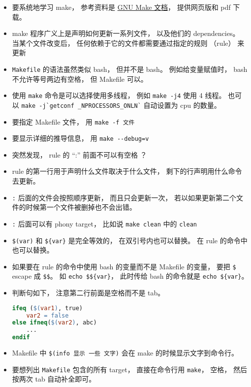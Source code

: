 


\begin{itemize}
\item 要系统地学习 make， 参考资料是 \href{https://www.gnu.org/software/make/manual/}{GNU Make 文档}， 提供网页版和 pdf 下载。
\item make 程序广义上是声明如何更新一系列文件， 以及他们的 dependencies。 当某个文件改变后， 任何依赖于它的文件都需要通过指定的规则 （rule） 来更新
\item \verb|Makefile| 的语法虽然类似 bash， 但并不是 bash。 例如给变量赋值时， bash 不允许等号两边有空格， 但 Makefile 可以。
\item 使用 \verb|make| 命令是可以选择使用多线程， 例如 \verb|make -j4| 使用 4 线程。 也可以 \verb|make -j`getconf _NPROCESSORS_ONLN`| 自动设置为 cpu 的数量。
\item 要指定 Makefile 文件， 用 \verb|make -f 文件|
\item 要显示详细的推导信息， 用 \verb|make --debug=v|
\item 突然发现， rule 的 “:” 前面不可以有空格 ？
\item rule 的第一行用于声明什么文件取决于什么文件， 剩下的行声明用什么命令去更新。
\item \verb|:| 后面的文件会按照顺序更新， 而且只会更新一次， 若以如果更新第二个文件的时候第一个文件被删掉也不会出错。
\item \verb|:| 后面可以有 phony target， 比如说 \verb|make clean| 中的 \verb|clean|
\item \verb|$(var)| 和 \verb|${var}| 是完全等效的， 在双引号内也可以替换。 在 rule 的命令中也可以替换。
\item 如果要在 rule 的命令中使用 bash 的变量而不是 Makefile 的变量， 要把 \verb|$| escape 成 \verb|$$|。 如 \verb|echo $${var}|， 此时传给 bash 的命令就是 \verb|echo ${var}|。
\item 判断句如下， 注意第二行前面是空格而不是 tab。
\begin{lstlisting}[language=makefile]
ifeq ($(var1), true)
    var2 = false
else ifneq($(var2), abc)
    ...
endif
\end{lstlisting}
\item Makefile 中 \verb|$(info 显示 一些 文字)| 会在 make 的时候显示文字到命令行。
\item 要想列出 \verb|Makefile| 包含的所有 target， 直接在命令行用 \verb|make|， 空格， 然后按两次 tab 自动补全即可。

\end{itemize}
